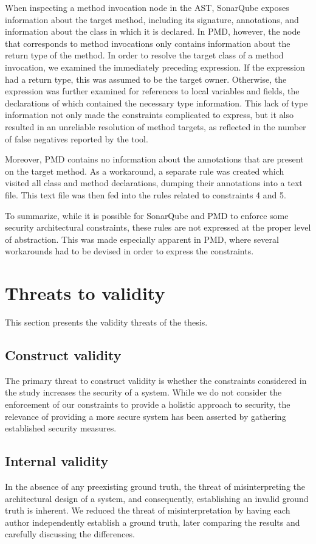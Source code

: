 When inspecting a method invocation node in the AST, SonarQube exposes information about the target method, including its signature, annotations, and information about the class in which it is declared. In PMD, however, the node that corresponds to method invocations only contains information about the return type of the method. In order to resolve the target class of a method invocation, we examined the immediately preceding expression. If the expression had a return type, this was assumed to be the target owner. Otherwise, the expression was further examined for references to local variables and fields, the declarations of which contained the necessary type information. This lack of type information not only made the constraints complicated to express, but it also resulted in an unreliable resolution of method targets, as reflected in the number of false negatives reported by the tool.

Moreover, PMD contains no information about the annotations that are present on the target method. As a workaround, a separate rule was created which visited all class and method declarations, dumping their annotations into a text file. This text file was then fed into the rules related to constraints 4 and 5.

To summarize, while it is possible for SonarQube and PMD to enforce some security architectural constraints, these rules are not expressed at the proper level of abstraction. This was made especially apparent in PMD, where several workarounds had to be devised in order to express the constraints.


\section{Threats to validity}
This section presents the validity threats of the thesis. 

\subsection{Construct validity}
The primary threat to construct validity is whether the constraints considered in the study increases the security of a system. While we do not consider the enforcement of our constraints to provide a holistic approach to security, the relevance of providing a more secure system has been asserted by gathering established security measures.

\subsection{Internal validity}
In the absence of any preexisting ground truth, the threat of misinterpreting the architectural design of a system, and consequently, establishing an invalid ground truth is inherent. We reduced the threat of misinterpretation by having each author independently establish a ground truth, later comparing the results and carefully discussing the differences.

